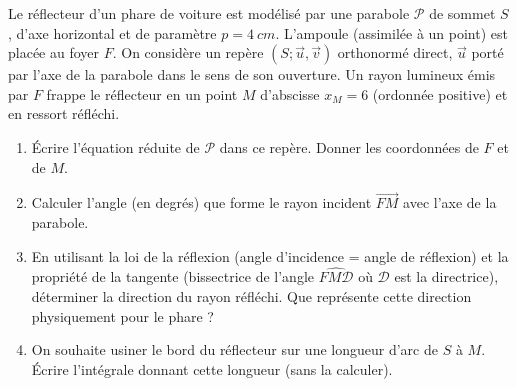 \documentclass[11pt]{article}
\begin{document}
\begin{exercice}
Le réflecteur d'un phare de voiture est modélisé par une parabole $\mathcal{P}$ de sommet $S$, d'axe horizontal et de paramètre $p = \SI{4}{cm}$. L'ampoule (assimilée à un point) est placée au foyer $F$. On considère un repère $(S;\vec{u},\vec{v})$ orthonormé direct, $\vec{u}$ porté par l'axe de la parabole dans le sens de son ouverture. Un rayon lumineux émis par $F$ frappe le réflecteur en un point $M$ d'abscisse $x_M = 6$ (ordonnée positive) et en ressort réfléchi.
\begin{enumerate}
    \item Écrire l'équation réduite de $\mathcal{P}$ dans ce repère. Donner les coordonnées de $F$ et de $M$.
    \item Calculer l'angle (en degrés) que forme le rayon incident $\overrightarrow{FM}$ avec l'axe de la parabole.
    \item En utilisant la loi de la réflexion (angle d'incidence = angle de réflexion) et la propriété de la tangente (bissectrice de l'angle $\widehat{FM\mathcal{D}}$ où $\mathcal{D}$ est la directrice), déterminer la direction du rayon réfléchi. Que représente cette direction physiquement pour le phare ?
    \item On souhaite usiner le bord du réflecteur sur une longueur d'arc de $S$ à $M$. Écrire l'intégrale donnant cette longueur (sans la calculer).
\end{enumerate}
\end{exercice}
\end{document}
